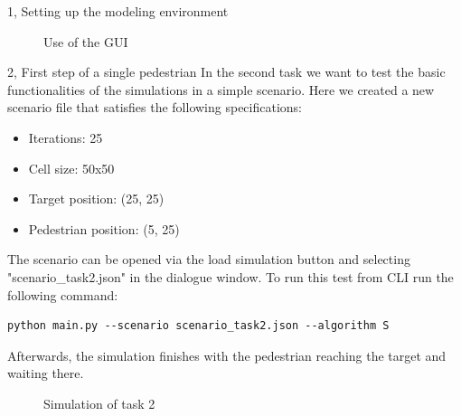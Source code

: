 \documentclass[10pt,a4paper]{article}
\begin{document}
\begin{task}{1, Setting up the modeling environment}
\begin{figure}[H]
\caption{Use of the GUI}
\label{task1}
\end{figure}
\end{task}

\newpage
\begin{task}{2, First step of a single pedestrian}
In the  second task we want to test the basic functionalities of the simulations in a simple scenario. Here we created a new scenario file that satisfies the following  specifications:
\begin{itemize}
    \item Iterations: 25
    \item Cell size: 50x50
    \item Target position: (25, 25)
    \item Pedestrian position: (5, 25)
\end{itemize}
The scenario can be opened via the load simulation button and selecting "scenario\_task2.json" in the dialogue window. To run this test from CLI run the following command:
\begin{verbatim}
python main.py --scenario scenario_task2.json --algorithm S
\end{verbatim}
Afterwards, the simulation finishes with the pedestrian reaching the target and waiting there.
\begin{figure}[H] 
\centering
{}
\caption{Simulation of task 2}
\end{figure}


\end{task}
\end{document}
